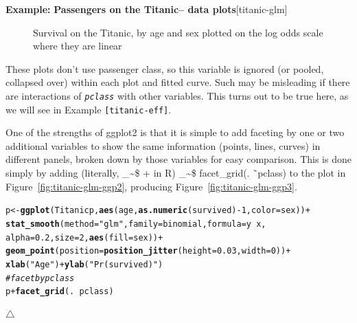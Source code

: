 \documentclass{article}
\makeatletter
\newcommand{\hlnum}[1]{\textcolor[rgb]{0.686,0.059,0.569}{#1}}%
\newcommand{\hlstr}[1]{\textcolor[rgb]{0.192,0.494,0.8}{#1}}%
\newcommand{\hlcom}[1]{\textcolor[rgb]{0.678,0.584,0.686}{\textit{#1}}}%
\newcommand{\hlopt}[1]{\textcolor[rgb]{0,0,0}{#1}}%
\newcommand{\hlstd}[1]{\textcolor[rgb]{0.345,0.345,0.345}{#1}}%
\newcommand{\hlkwb}[1]{\textcolor[rgb]{0.69,0.353,0.396}{#1}}%
\newcommand{\hlkwc}[1]{\textcolor[rgb]{0.333,0.667,0.333}{#1}}%
\newcommand{\hlkwd}[1]{\textcolor[rgb]{0.737,0.353,0.396}{\textbf{#1}}}%
\newenvironment{kframe}{%
 \def\at@end@of@kframe{}%
 \ifinner\ifhmode%
  \def\at@end@of@kframe{\end{minipage}}%
  \begin{minipage}{\columnwidth}%
 \fi\fi%
 \def\FrameCommand##1{\hskip\@totalleftmargin \hskip-\fboxsep
 \colorbox{shadecolor}{##1}\hskip-\fboxsep
     \hskip-\linewidth \hskip-\@totalleftmargin \hskip\columnwidth}%
 \MakeFramed {\advance\hsize-\width
   \@totalleftmargin\z@ \linewidth\hsize
   \@setminipage}}%
 {\par\unskip\endMakeFramed%
 \at@end@of@kframe}
\newenvironment{knitrout}{}{} %
\newcommand{\figref}[1]{Figure~\ref{#1}}
\newcommand{\var}[1]{\textit{\texttt{#1}}}
\newcommand\code{\bgroup\@makeother\_\@makeother\~\@makeother\$\@codex}
\def\@codex#1{{\normalfont\ttfamily\hyphenchar\font=-1 #1}\egroup}
\let\proglang=\textsf
\newcommand{\R}{\proglang{R}\xspace}
\newcommand{\pkg}[1]{\textsf{#1}}
\newenvironment{Example}[2][unnamed-example]%
  {\medskip\noindent\textbf{\textsf{Example:}}
   \textbf{#2}\hfill [#1]\par\smallskip
  }
  {\hfill $\triangle$}
\makeatother
\begin{document}
\begin{Example}[titanic-glm]{Passengers on the Titanic-- data plots}
\begin{knitrout}
\begin{figure}[hb]
{}

\caption[Survival on the Titanic, by age and sex plotted on the log odds scale where they are linear]{Survival on the Titanic, by age and sex plotted on the log odds scale where they are linear\label{fig:titanic-glm-ggp-logit}}
\end{figure}


\end{knitrout}



These plots don't use passenger class, so this variable is ignored
(or pooled, collapsed over) within each plot and fitted curve.   
Such  may be misleading
if there are interactions of \var{pclass} with other variables.
This turns out to be true here, as we will see in Example \texttt{[titanic-eff]}.

One of the strengths
of \pkg{ggplot2} is that it is simple to add faceting by one or two
additional variables to show the same information (points, lines, curves)
in different panels, broken down by those variables for easy comparison.
This is done simply by adding (literally, \code{+} in \R) 
\code{facet\_grid(. \~\ pclass)} to the plot in \figref{fig:titanic-glm-ggp2},
producing \figref{fig:titanic-glm-ggp3}.
\begin{knitrout}
\color{fgcolor}\begin{kframe}
\begin{alltt}
\hlstd{p} \hlkwb{<-} \hlkwd{ggplot}\hlstd{(Titanicp,} \hlkwd{aes}\hlstd{(age,} \hlkwd{as.numeric}\hlstd{(survived)}\hlopt{-}\hlnum{1}\hlstd{,} \hlkwc{color}\hlstd{=sex))} \hlopt{+}
  \hlkwd{stat_smooth}\hlstd{(}\hlkwc{method}\hlstd{=}\hlstr{"glm"}\hlstd{,} \hlkwc{family}\hlstd{=binomial,} \hlkwc{formula}\hlstd{=y}\hlopt{~}\hlstd{x,}
              \hlkwc{alpha}\hlstd{=}\hlnum{0.2}\hlstd{,} \hlkwc{size}\hlstd{=}\hlnum{2}\hlstd{,} \hlkwd{aes}\hlstd{(}\hlkwc{fill}\hlstd{=sex))} \hlopt{+}
        \hlkwd{geom_point}\hlstd{(}\hlkwc{position}\hlstd{=}\hlkwd{position_jitter}\hlstd{(}\hlkwc{height}\hlstd{=}\hlnum{0.03}\hlstd{,} \hlkwc{width}\hlstd{=}\hlnum{0}\hlstd{))} \hlopt{+}
        \hlkwd{xlab}\hlstd{(}\hlstr{"Age"}\hlstd{)} \hlopt{+} \hlkwd{ylab}\hlstd{(}\hlstr{"Pr (survived)"}\hlstd{)}
\hlcom{# facet by pclass}
\hlstd{p} \hlopt{+} \hlkwd{facet_grid}\hlstd{(.} \hlopt{~} \hlstd{pclass)}
\end{alltt}
\end{kframe}\begin{figure}[hb]



\end{figure}
\end{knitrout}
\end{Example}
\end{document}
